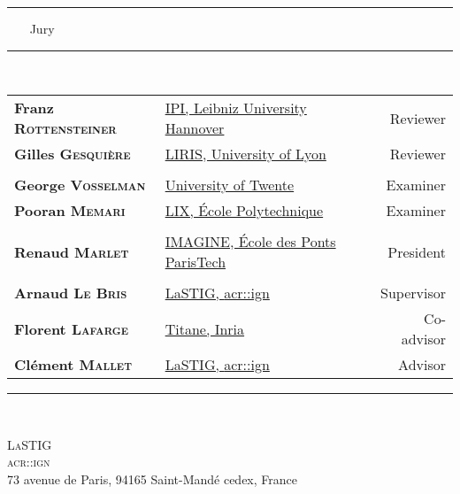 \begin{titlepage}
\begin{center}
        \rule{.43\textwidth}{1pt} ~~~ {\Large Jury} ~~~ \rule{.43\textwidth}{1pt}\\
        \vspace*{1em}
        \begin{tabular}{l x{.5\textwidth} r}
            \textbf{Franz \textsc{Rottensteiner}} & \href{https://www.ipi.uni-hannover.de/en/rottensteiner/}{IPI, Leibniz University Hannover} & Reviewer \\
            \textbf{Gilles \textsc{Gesquière}} & \href{https://perso.liris.cnrs.fr/gilles.gesquiere/wiki/doku.php}{LIRIS, University of Lyon} & Reviewer \\
             & & \\
            \textbf{George \textsc{Vosselman}} & \href{https://research.utwente.nl/en/persons/george-vosselman}{University of Twente} & Examiner \\
            \textbf{Pooran \textsc{Memari}} & \href{http://www.lix.polytechnique.fr/~memari/}{LIX, \'Ecole Polytechnique} & Examiner \\
             & & \\
            \textbf{Renaud \textsc{Marlet}} & \href{http://imagine.enpc.fr/~marletr/}{IMAGINE, \'Ecole des Ponts ParisTech} & President \\
             & & \\
            \textbf{Arnaud \textsc{Le Bris}} & \href{http://recherche.ign.fr/labos/matis/~Le_Bris}{LaSTIG, \acrshort*{acr::ign}} & Supervisor \\
            \textbf{Florent \textsc{Lafarge}} & \href{https://www-sop.inria.fr/members/Florent.Lafarge/}{Titane, Inria} & Co-advisor \\
            \textbf{Clément \textsc{Mallet}} & \href{http://recherche.ign.fr/labos/matis/~mallet}{LaSTIG, \acrshort*{acr::ign}} & Advisor \\
        \end{tabular}
        \vspace*{1em}
        \rule{\textwidth}{1pt}\\

        \vspace*{10mm}

        \begin{minipage}{.75\textwidth}
            \centering
            \small
            \textsc{LaSTIG\\ \acrfull*{acr::ign}}\\
            73 avenue de Paris, 94165 Saint-Mandé cedex, France
        \end{minipage}
    \end{center}
\end{titlepage}

